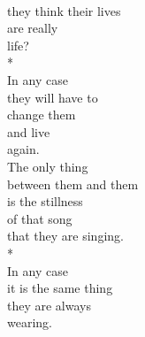 \documentclass[smalldemyvopaper,11pt,twoside,onecolumn,openright,extrafontsizes]{memoir}
\begin{document}
\\they think their lives
\\are really
\\life?
\\*
\\In any case
\\they will have to
\\change them
\\and live
\\again.
\\The only thing
\\between them and them
\\is the stillness
\\of that song
\\that they are singing.
\\*
\\In any case
\\it is the same thing
\\they are always
\\wearing.
\end{document}
